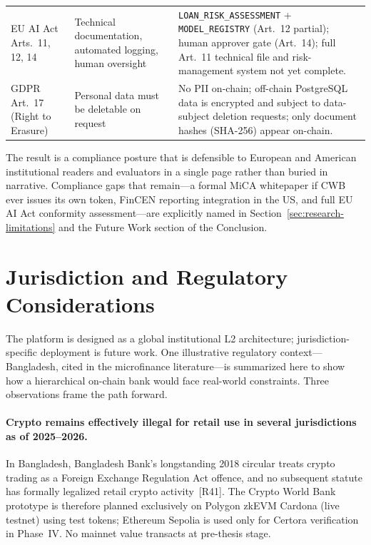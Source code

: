 \documentclass[12pt,a4paper]{report}
\begin{document}
\begin{table}[H]
\begin{tabular}{p{3.2cm}p{4.6cm}p{5.8cm}}
EU AI Act Arts.~11, 12, 14 & Technical documentation, automated logging, human oversight & \texttt{LOAN\_RISK\_ASSESSMENT} + \texttt{MODEL\_REGISTRY} (Art.~12 partial); human approver gate (Art.~14); full Art.~11 technical file and risk-management system not yet complete. \\
GDPR Art.~17 (Right to Erasure) & Personal data must be deletable on request & No PII on-chain; off-chain PostgreSQL data is encrypted and subject to data-subject deletion requests; only document hashes (SHA-256) appear on-chain. \\
\bottomrule
\end{tabular}
\end{table}

The result is a compliance posture that is defensible to European and American institutional readers and evaluators in a single page rather than buried in narrative. Compliance gaps that remain---a formal MiCA whitepaper if CWB ever issues its own token, FinCEN reporting integration in the US, and full EU AI Act conformity assessment---are explicitly named in Section~\ref{sec:research-limitations} and the Future Work section of the Conclusion.

\section{Jurisdiction and Regulatory Considerations}
\label{sec:bangladesh-reg}

The platform is designed as a global institutional L2 architecture; jurisdiction-specific deployment is future work. One illustrative regulatory context---Bangladesh, cited in the microfinance literature---is summarized here to show how a hierarchical on-chain bank would face real-world constraints. Three observations frame the path forward.

\paragraph{Crypto remains effectively illegal for retail use in several jurisdictions as of 2025--2026.}
In Bangladesh, Bangladesh Bank's longstanding 2018 circular treats crypto trading as a Foreign Exchange Regulation Act offence, and no subsequent statute has formally legalized retail crypto activity~[R41]. The Crypto World Bank prototype is therefore planned exclusively on Polygon zkEVM Cardona (live testnet) using test tokens; Ethereum Sepolia is used only for Certora verification in Phase~IV. No mainnet value transacts at pre-thesis stage.
\end{document}
